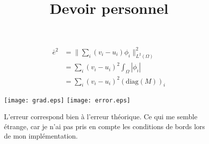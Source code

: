 \documentclass{article}
\date{}
\date{}
\title{Devoir personnel}
\begin{document}
\maketitle
\section{}%

\begin{equation}
\begin{aligned}
\bar{e}^2 &= \|\sum_i (v_i-u_i)\phi_i\|_{L^2(\Omega)}^2\\
&= \sum_i(v_i-u_i)^2 \int_{\Omega}|\phi_i|\\
&= \sum_i (v_i - u_i )^2 (\text{diag}(M))_i
\end{aligned}
\end{equation}

\newpage

\begin{figure}

\texttt{[image: grad.eps]}
\texttt{[image: error.eps]}

L’erreur correspond bien à l’erreur théorique. 
Ce qui me semble étrange, car je n’ai pas pris en compte les conditions de bords lors de mon implémentation.
\end{figure}
\end{document}
